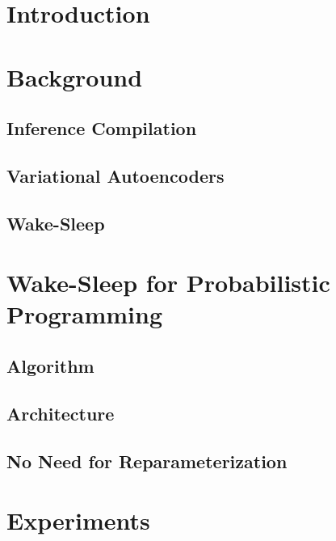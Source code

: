 \documentclass{article}
\begin{document}

\begin{abstract}
\end{abstract}

\section{Introduction}

\section{Background}

\subsection{Inference Compilation}
\subsection{Variational Autoencoders}
\subsection{Wake-Sleep}

\section{Wake-Sleep for Probabilistic Programming}

\subsection{Algorithm}
\subsection{Architecture}
\subsection{No Need for Reparameterization}

\section{Experiments}
\end{document}
